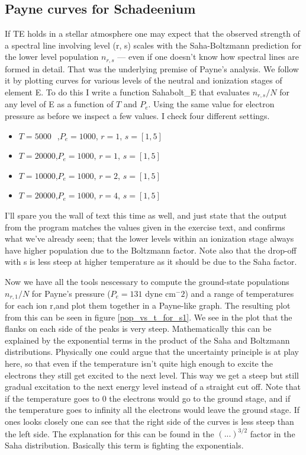 \documentclass{aa}   %
\begin{document}
\subsection{Payne curves for Schadeenium}
If TE holds in a stellar atmosphere one may expect that the observed strength of a spectral line involving level (r, s) scales with the Saha-Boltzmann prediction for the lower level population $n_{r,s}$ — even if one doesn’t know how spectral lines are formed in detail. That was the underlying premise of Payne’s analysis. We follow it by plotting curves for various levels of the neutral and ionization stages of element E.
To do this I write a function Sahabolt\_E that evaluates $n_{r,s}/N$ for any level of E as a function of $T$ and $P_e$.
Using the same value for electron pressure as before we inspect a few values. I check four different settings.
\begin{itemize}
 \item $T = 5000~$~,$P_e = 1000$, $r = 1$, $s = [1,5]$
 \item $T = 20000$,$P_e = 1000$, $r = 1$, $s = [1,5]$
 \item $T = 10000$,$P_e = 1000$, $r = 2$, $s = [1,5]$
 \item $T = 20000$,$P_e = 1000$, $r = 4$, $s = [1,5]$
\end{itemize}
I'll spare you the wall of text this time as well, and just state that the output from the program matches the values given in the exercise text, and confirms what we've already seen; that the lower levels within an ionization stage always have higher population due to the Boltzmann factor. Note also that the drop-off with s is less steep at higher temperature as it should be due to the Saha factor.

Now we have all the tools nescessary to compute the ground-state populations $n_{r,1}/N$ for Payne's pressure ($P_e = 131$ dyne cm$^-2$) and a range of temperatures for each ion r,and plot them together in a Payne-like graph. The resulting plot from this can be seen in figure \ref{pop_vs_t_for_s1}. We see in the plot that the flanks on each side of the peaks is very steep. Mathematically this can be explained by the exponential terms in the product of the Saha and Boltzmann distributions. Physically one could argue that the uncertainty principle is at play here, so that even if the temperature isn't quite high enough to excite the electrons they still get excited to the next level. This way we get a steep but still gradual excitation to the next energy level instead of a straight cut off. Note that if the temperature goes to 0 the electrons would go to the ground stage, and if the temperature goes to infinity all the electrons would leave the ground stage. If ones looks closely one can see that the right side of the curves is less steep than the left side. The explanation for this can be found in the $(...)^{3/2}$ factor in the Saha distribution. Basically this term is fighting the exponentials.
\end{document}
